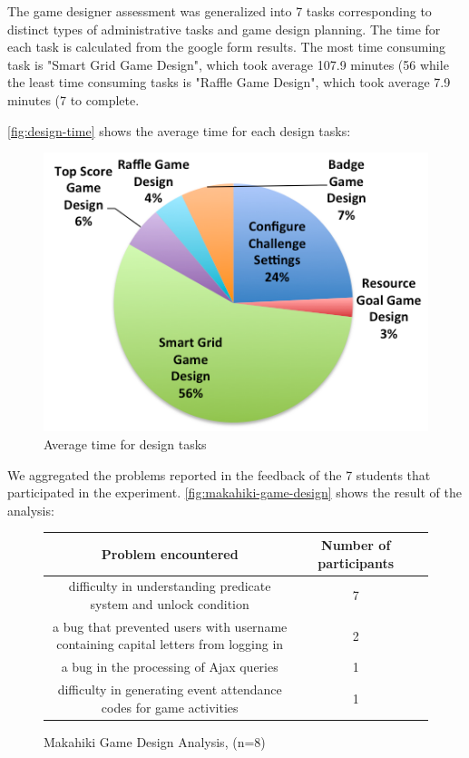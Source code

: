 \documentclass{sigchi}
\newcommand\tabhead[1]{\small\textbf{#1}}
\begin{document}
The game designer assessment was generalized into 7 tasks corresponding to
distinct types of administrative tasks and game design planning. The time for each task is
calculated from the google form results.  The most time consuming task
 is "Smart Grid Game Design", which took average 107.9 minutes (56%
 while the least time
  consuming tasks is "Raffle Game Design", which took average 7.9 minutes (7%
  to complete.

\autoref{fig:design-time} shows the average time for each design tasks:

\begin{figure}[ht!]
  \center
  \includegraphics[width=0.8\columnwidth]{design-time}
  \caption{Average time for design tasks}
  \label{fig:design-time}
\end{figure}

 We aggregated the problems reported in the feedback of the 7 students that participated in the experiment.
\autoref{fig:makahiki-game-design} shows the result of the analysis:

\begin{figure}[ht!]
  \centering
  \begin{tabular}{|c|c|c|}
    \hline
    \multicolumn{1}{|p{0.7\columnwidth}|}{\centering\tabhead{Problem encountered}} &
    \multicolumn{1}{|p{0.2\columnwidth}|}{\centering\tabhead{Number of participants}} \\
    \hline
    \multicolumn{1}{|p{0.7\columnwidth}|}{difficulty in understanding predicate system and unlock condition} &
    \multicolumn{1}{|p{0.2\columnwidth}|}{7} \\
    \hline
    \multicolumn{1}{|p{0.7\columnwidth}|}{a bug that prevented users with username
containing capital letters from logging in} &
    \multicolumn{1}{|p{0.2\columnwidth}|}{2} \\
    \hline
    \multicolumn{1}{|p{0.7\columnwidth}|}{a bug in the processing of Ajax queries} &
    \multicolumn{1}{|p{0.2\columnwidth}|}{1} \\
    \hline
    \multicolumn{1}{|p{0.7\columnwidth}|}{difficulty in generating event attendance codes for game activities} &
    \multicolumn{1}{|p{0.2\columnwidth}|}{1} \\
    \hline
  \end{tabular}
  \caption{Makahiki Game Design Analysis, (n=8)}
  \label{fig:makahiki-game-design}
\end{figure}
\end{document}
